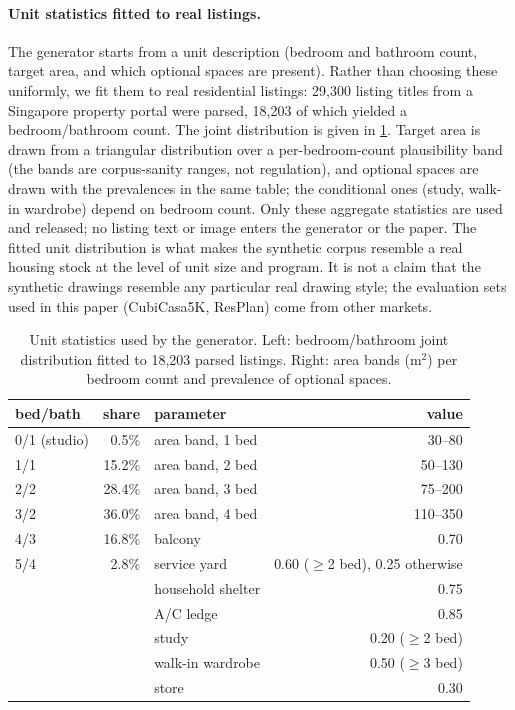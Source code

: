 \documentclass{article}
\begin{document}
\paragraph{Unit statistics fitted to real listings.}
The generator starts from a unit description (bedroom and bathroom count,
target area, and which optional spaces are present). Rather than choosing
these uniformly, we fit them to real residential listings: 29{,}300 listing
titles from a Singapore property portal were parsed, 18{,}203 of which yielded
a bedroom/bathroom count. The joint distribution is given in
\cref{tab:synthmeta}. Target area is drawn from a triangular distribution over
a per-bedroom-count plausibility band (the bands are corpus-sanity ranges, not
regulation), and optional spaces are drawn with the prevalences in the same
table; the conditional ones (study, walk-in wardrobe) depend on bedroom
count. Only these aggregate statistics are used and released; no listing text
or image enters the generator or the paper. The fitted unit distribution is
what makes the synthetic corpus resemble a real housing stock at the level of
unit size and program. It is not a claim that the synthetic drawings resemble
any particular real drawing style; the evaluation sets used in this paper
(CubiCasa5K, ResPlan) come from other markets.

\begin{table}[h]
\centering
\caption{Unit statistics used by the generator. Left: bedroom/bathroom joint
distribution fitted to 18{,}203 parsed listings. Right: area bands
($\mathrm{m}^2$) per bedroom count and prevalence of optional spaces.}
\label{tab:synthmeta}
\small
\begin{tabular}{lr@{\hspace{2em}}lr}
\toprule
bed/bath & share & parameter & value \\
\midrule
0/1 (studio) & 0.5\%  & area band, 1 bed & 30--80 \\
1/1          & 15.2\% & area band, 2 bed & 50--130 \\
2/2          & 28.4\% & area band, 3 bed & 75--200 \\
3/2          & 36.0\% & area band, 4 bed & 110--350 \\
4/3          & 16.8\% & balcony & 0.70 \\
5/4          & 2.8\%  & service yard & 0.60 ($\ge$2 bed), 0.25 otherwise \\
             &        & household shelter & 0.75 \\
             &        & A/C ledge & 0.85 \\
             &        & study & 0.20 ($\ge$2 bed) \\
             &        & walk-in wardrobe & 0.50 ($\ge$3 bed) \\
             &        & store & 0.30 \\
\bottomrule
\end{tabular}
\end{table}
\end{document}
